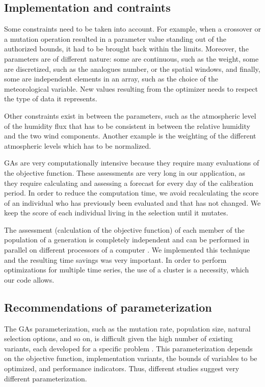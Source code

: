 \documentclass[twocol]{ametsoc}
\begin{document}
\subsection{Implementation and contraints}

Some constraints need to be taken into account. For example, when a crossover or a mutation operation resulted in a parameter value standing out of the authorized bounds, it had to be brought back within the limits. Moreover, the parameters are of different nature: some are continuous, such as the weight, some are discretized, such as the analogues number, or the spatial windows, and finally, some are independent elements in an array, such as the choice of the meteorological variable. New values resulting from the optimizer needs to respect the type of data it represents.

Other constraints exist in between the parameters, such as the atmospheric level of the humidity flux that has to be consistent in between the relative humidity and the two wind components. Another example is the weighting of the different atmospheric levels which has to be normalized.

GAs are very computationally intensive because they require many evaluations of the objective function. These assessments are very long in our application, as they require calculating and assessing a forecast for every day of the calibration period. In order to reduce the computation time, we avoid recalculating the score of an individual who has previously been evaluated and that has not changed. We keep the score of each individual living in the selection until it mutates.

The assessment (calculation of the objective function) of each member of the population of a generation is completely independent and can be performed in parallel on different processors of a computer \citep{Haupt2004, Alliot2005}. We implemented this technique and the resulting time savings was very important. In order to perform optimizations for multiple time series, the use of a cluster is a necessity, which our code allows.


\subsection{Recommendations of parameterization}

The GAs parameterization, such as the mutation rate, population size, natural selection options, and so on, is difficult given the high number of existing variants, each developed for a specific problem \citep{Haupt2004, Costa2007a}. This parameterization depends on the objective function, implementation variants, the bounds of variables to be optimized, and performance indicators. Thus, different studies suggest very different parameterization.
\end{document}
